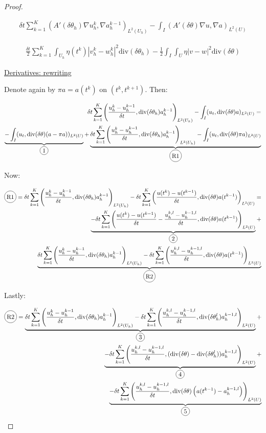 \documentclass[english,a4paper,9pt,oneside]{scrbook}	%
\theoremstyle{break}
\newenvironment{mproof}[1][\proofname]{%
  \begin{proof}[#1]$ $\par\nobreak\ignorespaces
}{%
  \end{proof}
}
\renewcommand*{\proofname}{Proof}
\theoremstyle{remark}
\newcommand{\te}{\theta}
\newcommand{\dive}{\text{div}}
\newcommand*\circled[1]{\tikz[baseline=(char.base)]{
            \node[shape=circle,draw,inner sep=2pt] (char) {#1};}}
\begin{document}
\begin{mproof}
\begin{align*}
	\delta t \sum_{k=1}^{K} (A'(\delta \theta_h ) \nabla u_h^k, \nabla a_h^{k-1})_{L^2(U_h)} - \int_I (A'(\delta\te )\nabla u, \nabla a)_{L^2(U)}
\end{align*}

\begin{align*}
	\frac{\delta t}{2} \sum_{k=1}^{K} \int_{U_h} \eta(t^k)|v_h^k-w_h^k|^2  \dive(\delta \theta_h ) - \frac{1}{2}\int_I\int_{U}\eta |v-w|^2\dive(\delta \te)
\end{align*}

\underline{Derivatives: rewriting}

Denote again by $\pi a = a(t^k)$ on $(t^k,t^{k+1})$. Then:

\begin{align*}
	\delta t \sum_{k=1}^{K} \left (\frac{u_h^{k}-u_h^{k-1}}{\delta t}, \dive(\delta \theta_h ) a_h^{k-1} \right )_{L^2(U_h)}  - \int_I (u_t , \dive(\delta \te) a)_{L^2(U)} = \\
	\underbrace{- \int_I (u_t , \dive(\delta \te) (a -\pi a))_{L^2(U)}}_{\circled{1}}+ \underbrace{\delta t \sum_{k=1}^{K} \left (\frac{u_h^{k}-u_h^{k-1}}{\delta t}, \dive(\delta \theta_h ) a_h^{k-1} \right )_{L^2(U_h)} - \int_I (u_t , \dive(\delta \te) \pi a)_{L^2(U)}}_{\circled{R1}}
\end{align*}

Now:

\begin{align*}
	\circled{R1} = \delta t \sum_{k=1}^{K} \left (\frac{u_h^{k}-u_h^{k-1}}{\delta t}, \dive(\delta \theta_h ) a_h^{k-1} \right )_{L^2(U_h)} - \delta t \sum_{k=1}^{K}\left (\frac{u(t^{k})-u(t^{k-1})}{\delta t} , \dive(\delta \te)  a(t^{k-1})\right )_{L^2(U)}=\\
\underbrace{- \delta t \sum_{k=1}^{K}\left (\frac{u(t^{k})-u(t^{k-1})}{\delta t} -\frac{u^{k,l}_h-u^{k-1,l}_h}{\delta t} , \dive(\delta \te)  a(t^{k-1})\right )_{L^2(U)}}_{\circled{2}}+\\ \underbrace{\delta t \sum_{k=1}^{K} \left (\frac{u_h^{k}-u_h^{k-1}}{\delta t}, \dive(\delta \theta_h ) a_h^{k-1} \right )_{L^2(U_h)}- \delta t \sum_{k=1}^{K}\left (\frac{u^{k,l}_h-u^{k-1,l}_h}{\delta t} , \dive(\delta \te)  a(t^{k-1})\right )_{L^2(U)}}_{\circled{R2}} 
\end{align*}

Lastly:

\begin{align*}
	\circled{R2} = \underbrace{\delta t \sum_{k=1}^{K} \left (\frac{u_h^{k}-u_h^{k-1}}{\delta t}, \dive(\delta \theta_h ) a_h^{k-1} \right )_{L^2(U_h)}
		- \delta t \sum_{k=1}^{K}\left (\frac{u^{k,l}_h-u^{k-1,l}_h}{\delta t} , \dive(\delta \te_h^l)  a_h^{k-1,l}\right )_{L^2(U)} }_{\circled{3}}+ \\
	\underbrace{- \delta t \sum_{k=1}^{K}\left (\frac{u^{k,l}_h-u^{k-1,l}_h}{\delta t} , (\dive(\delta \te) - \dive(\delta \te_h^l)  )a_h^{k-1,l}\right )_{L^2(U)}}_{\circled{4}} + \\
	\underbrace{- \delta t \sum_{k=1}^{K}\left (\frac{u^{k,l}_h-u^{k-1,l}_h}{\delta t} , \dive(\delta \te) \left(a(t^{k-1})-a_h^{k-1,l}\right)\right )_{L^2(U)}}_{\circled{5}}
\end{align*}


\end{mproof}
\end{document}
